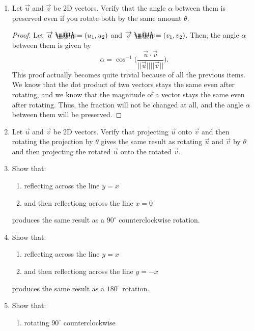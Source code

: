 \documentclass{article}
\makeatletter
\newcommand*{\defeq}{\mathrel{\rlap{%
                     \raisebox{0.3ex}{$\m@th\cdot$}}%
                     \raisebox{-0.3ex}{$\m@th\cdot$}}%
                     =}
\makeatother
\begin{document}
\begin{enumerate}
\begin{proof}
    \end{proof}
    \item Let \(\overrightarrow{u}\) and \(\overrightarrow{v}\) be 2D vectors. Verify that the angle \(\alpha\) between them is preserved even if you rotate both by the same amount \(\theta\).\begin{proof}
        Let \(\overrightarrow{u} \defeq (u_1,u_2)\) and \(\overrightarrow{v} \defeq (v_1,v_2)\). Then, the angle \(\alpha\) between them is given by\[
            \alpha = \cos^{-1} \Biggl(\frac{\overrightarrow{u}\cdot\overrightarrow{v}}{\big|\!\big| \overrightarrow{u} \big|\!\big| \big|\!\big| \overrightarrow{v} \big|\!\big|}\Biggr). 
        \] This proof actually becomes quite trivial because of all the previous items. We know that the dot product of two vectors stays the same even after rotating, and we know that the magnitude of a vector 
        stays the same even after rotating. Thus, the fraction will not be changed at all, and the angle \(\alpha\) between them will be preserved. 
    \end{proof}
    \item Let \(\overrightarrow{u}\) and \(\overrightarrow{v}\) be 2D vectors. Verify that projecting \(\overrightarrow{u}\) onto \(\overrightarrow{v}\) and then rotating the projection by \(\theta\) gives
    the same result as rotating \(\overrightarrow{u}\) and \(\overrightarrow{v}\) by \(\theta\) and then projecting the rotated \(\overrightarrow{u}\) onto the rotated \(\overrightarrow{v}\). 
    \item Show that:\begin{enumerate}
        \item reflecting across the line \(y = x\)
        \item and then reflectiong across the line \(x=0\)
    \end{enumerate} produces the same result as a \(90^\circ\) counterclockwise rotation.
    \item Show that:\begin{enumerate}
        \item reflecting across the line \(y=x\)
        \item and then reflectiong across the line \(y = -x\) 
    \end{enumerate} produces the same result as a \(180^\circ\) rotation. 
    \item Show that:\begin{enumerate}
        \item rotating \(90^\circ\) counterclockwise

\end{enumerate}
\end{enumerate}
\end{document}
